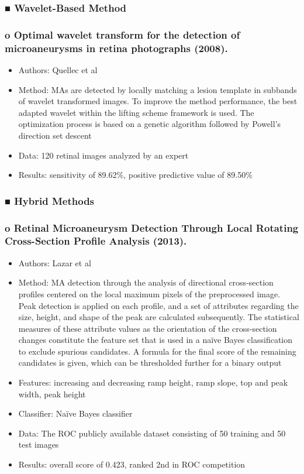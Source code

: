 \documentclass[12pt]{report}
\begin{document}
\subsubsection{■ Wavelet-Based Method}
\subsubsection{o    Optimal wavelet transform for the detection of microaneurysms in retina photographs (2008). \cite{quellec2008optimal}}
\begin{itemize}
\item Authors: Quellec et al
\item Method: MAs are detected by locally matching a lesion template in subbands of wavelet transformed images. To improve the method performance, the best adapted wavelet within the lifting scheme framework is used. The optimization process is based on a genetic algorithm followed by Powell’s direction set descent
\item Data: 120 retinal images analyzed by an expert
\item Results: sensitivity of 89.62\%, positive predictive value of 89.50\%
\end{itemize}

\subsubsection{■ Hybrid Methods}
\subsubsection{o   Retinal Microaneurysm Detection Through Local Rotating Cross-Section Profile Analysis (2013). \cite{lazar2013retinal}}
\begin{itemize}
\item Authors: Lazar et al
\item Method: MA detection through the analysis of directional cross-section profiles centered on the local maximum pixels of the preprocessed image. Peak detection is applied on each profile, and a set of attributes regarding the size, height, and shape of the peak are calculated subsequently. The statistical measures of these attribute values as the orientation of the cross-section changes constitute the feature set that is used in a naïve Bayes classification to exclude spurious candidates. A formula for the final score of the remaining candidates is given, which can be thresholded further for a binary output
\item Features: increasing and decreasing ramp height, ramp slope, top and peak width, peak height
\item Classifier: Naïve Bayes classifier
\item Data: The ROC publicly available dataset consisting of 50 training and 50 test images
\item Results: overall score of 0.423, ranked 2nd in ROC competition
\end{itemize}
\end{document}
